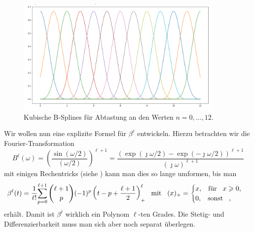 %
\begin{figure}
    \centering\includegraphics[width=0.9\textwidth]{img/bsplines/all_splines.png}
    \caption{Kubische B-Splines f\"ur Abtastung an den Werten $n = 0, \dots, 12$.}\label{bsplines_all_splines}
\end{figure}
%
Wir wollen nun eine explizite Formel f\"ur $\beta^\ell$ entwickeln. Hierzu betrachten wir die Fourier-Transformation 
\begin{equation}
    B^\ell(\omega) 
        = \left(\frac{\sin(\omega / 2)}{(\omega / 2)}\right)^{\ell + 1}
        = \frac{(\exp(\jmath \omega/2) - \exp(-\jmath \omega/2))^{\ell+1}}{
            (\jmath \omega)^{\ell + 1}
        }
\end{equation}
mit einigen Rechentricks (siehe \cite[Box 1.]{unser1999splines_mag}) kann man dies so lange umformen, bis man
\begin{equation}
    \beta^\ell(t) = \frac{1}{\ell !}{\sum\limits_{p = 0}^{\ell+1}{
            \binom{\ell+1}{p}(-1)^p
            \left(t - p + \frac{\ell+1}{2}\right)_+^\ell
        }}
    {\hspace{3mm} \text{mit} \hspace{3mm}}
    (x)_+ = \begin{cases}
      x, {\hspace{3mm} \text{f\"ur} \hspace{3mm}} x \geqslant 0, \\
      0, {\hspace{3mm} \text{sonst} \hspace{3mm}},  
    \end{cases}
\end{equation}
erh\"alt. Damit ist $\beta^\ell$ wirklich ein Polynom $\ell$-ten Grades. Die Stetig- und Differenzierbarkeit muss man sich aber noch separat \"uberlegen. 

